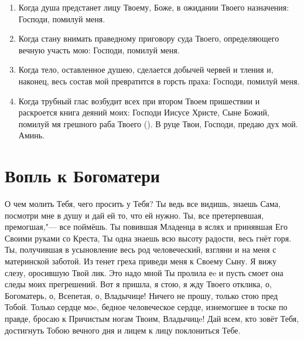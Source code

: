 \begin{mymulticols}
\begin{enumerate}
\item Когда душа предстанет лицу Твоему, Боже, в ожидании Твоего назначения: Господи, помилуй меня. 

\item Когда стану внимать праведному приговору суда Твоего, определяющего вечную участь мою: Господи, помилуй меня. 

\item Когда тело, оставленное душею, сделается добычей червей и тления и, наконец, весь состав мой превратится в горсть праха: Господи, помилуй меня. 

\item Когда трубный глас возбудит всех при втором Твоем пришествии и раскроется книга деяний моих: Господи Иисусе Христе, Сыне Божий, помилуй мя грешного раба Твоего (). В руце Твои, Господи, предаю дух мой. Аминь. 

\end{enumerate}

\end{mymulticols}

\section{Вопль к Богоматери}\begin{mymulticols}
 

О чем молить Тебя, чего просить у Тебя? Ты ведь все видишь, знаешь Сама, посмотри мне в душу и дай ей то, что ей нужно. Ты, все претерпевшая, премогшая,"--- все поймёшь. Ты повившая Младенца в яслях и принявшая Его Своими руками со Креста, Ты одна знаешь всю высоту радости, весь гнёт горя. Ты, получившая в усыновление весь род человеческий, взгляни и на меня с материнской заботой. Из тенет греха приведи меня к Своему Сыну. Я вижу слезу, оросившую Твой лик. Это надо мной Ты пролила еe и пусть смоет она следы моих прегрешений. Вот я пришла, я стою, я жду Твоего отклика, о, Богоматерь, о, Всепетая, о, Владычице! Ничего не прошу, только стою пред Тобой. Только сердце моe, бедное человеческое сердце, изнемогшее в тоске по правде, бросаю к Причистым ногам Твоим, Владычицe! Дай всем, кто зовёт Тебя, достигнуть Тобою вечного дня и лицем к лицу поклониться Тебе.

\end{mymulticols}

